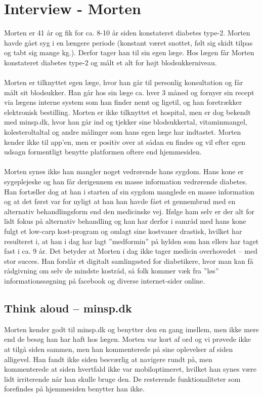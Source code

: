 \documentclass[english]{article}
\begin{document}
\section*{Interview - Morten}
Morten er 41 år og fik for ca. 8-10 år siden konstateret diabetes type-2. Morten havde gået syg i en længere periode (konstant været snottet, følt sig skidt tilpas og tabt sig mange kg.). Derfor tager han til sin egen læge. Hos lægen får Morten konstateret diabetes type-2 og målt et alt for højt blodsukkerniveau.
\\ \\
Morten er tilknyttet egen læge, hvor han går til personlig konsultation og får målt sit blodsukker. Han går hos sin læge ca. hver 3 måned og fornyer sin recept via lægens interne system som han finder nemt og ligetil, og han foretrækker elektronisk bestilling. Morten er ikke tilknyttet et hospital, men er dog bekendt med minsp.dk, hvor han går ind og tjekker sine blodsukkertal, vitaminmangel, kolesteroltaltal og andre målinger som hans egen læge har indtastet. Morten kender ikke til app'en, men er positiv over at sådan en findes og vil efter egen udsagn formentligt benytte platformen oftere end hjemmesiden. 
\\ \\
Morten synes ikke han mangler noget vedrørende hans sygdom. Hans kone er sygeplejeske og han får derigennem en masse information vedrørende diabetes. Han fortæller dog at han i starten af sin sygdom manglede en masse information og at det først var for nyligt at han han havde fået et gennembrud med en alternativ behandlingsform end den medicinske vej. Ifølge ham selv er der alt for lidt fokus på alternativ behandling og han har derfor i samråd med hans kone fulgt et low-carp kost-program og omlagt sine kostvaner drastisk, hvilket har resulteret i, at han i dag har lagt ”medformin” på hylden som han ellers har taget fast i ca. 9 år. Det betyder at Morten i dag ikke tager medicin overhovedet – med stor succes. Han forslår et digitalt samlingssted for diabetikere, hvor man kan få rådgivning om selv de mindste kostråd, så folk kommer væk fra ”løs” informationssøgning på facebook og diverse internet-sider online. 

\subsection*{Think aloud – minsp.dk}
Morten kender godt til minsp.dk og benytter den en gang imellem, men ikke mere end de besøg han har haft hos lægen. Morten var kort af ord og vi prøvede ikke at tilgå siden sammen, men han kommenterede på sine oplevelser af siden alligevel. Han fandt ikke siden besværlig at navigere rundt på, men kommenterede at siden hvertfald ikke var mobiloptimeret, hvilket han synes være lidt irriterende når han skulle bruge den. De resterende funktionaliteter som forefindes på hjemmesiden benytter han ikke.
\end{document}
